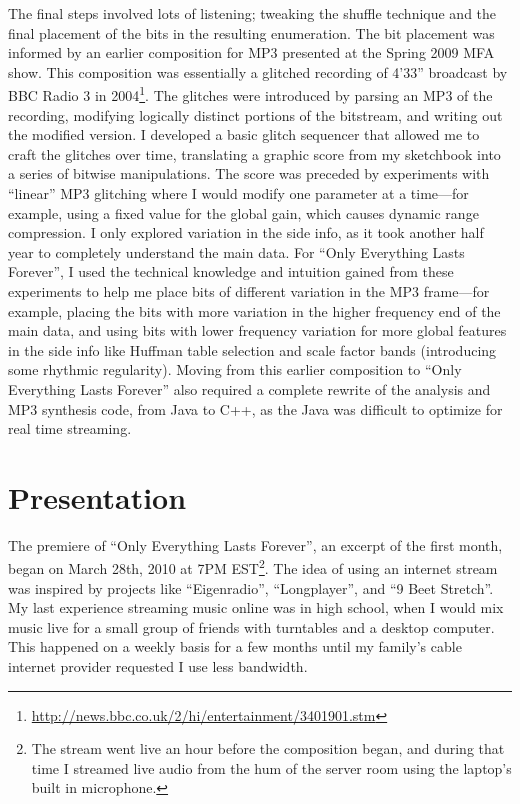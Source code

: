 \documentclass{thesis}
\begin{document}
The final steps involved lots of listening; tweaking the shuffle technique and the final placement of the bits in the resulting enumeration. The bit placement was informed by an earlier composition for MP3 presented at the Spring 2009 MFA show. This composition was essentially a glitched recording of 4'33'' broadcast by BBC Radio 3 in 2004\footnote{\url{http://news.bbc.co.uk/2/hi/entertainment/3401901.stm}}. The glitches were introduced by parsing an MP3 of the recording, modifying logically distinct portions of the bitstream, and writing out the modified version. I developed a basic glitch sequencer that allowed me to craft the glitches over time, translating a graphic score from my sketchbook into a series of bitwise manipulations. The score was preceded by experiments with ``linear'' MP3 glitching where I would modify one parameter at a time---for example, using a fixed value for the global gain, which causes dynamic range compression. I only explored variation in the side info, as it took another half year to completely understand the main data. For ``Only Everything Lasts Forever'', I used the technical knowledge and intuition gained from these experiments to help me place bits of different variation in the MP3 frame---for example, placing the bits with more variation in the higher frequency end of the main data, and using bits with lower frequency variation for more global features in the side info like Huffman table selection and scale factor bands (introducing some rhythmic regularity). Moving from this earlier composition to ``Only Everything Lasts Forever'' also required a complete rewrite of the analysis and MP3 synthesis code, from Java to C++, as the Java was difficult to optimize for real time streaming.

\section{Presentation}

The premiere of ``Only Everything Lasts Forever'', an excerpt of the first month, began on March 28th, 2010 at 7PM EST\footnote{The stream went live an hour before the composition began, and during that time I streamed live audio from the hum of the server room using the laptop's built in microphone.}. The idea of using an internet stream was inspired by projects like ``Eigenradio'', ``Longplayer'', and ``9 Beet Stretch''. My last experience streaming music online was in high school, when I would mix music live for a small group of friends with turntables and a desktop computer. This happened on a weekly basis for a few months until my family's cable internet provider requested I use less bandwidth.
\end{document}

